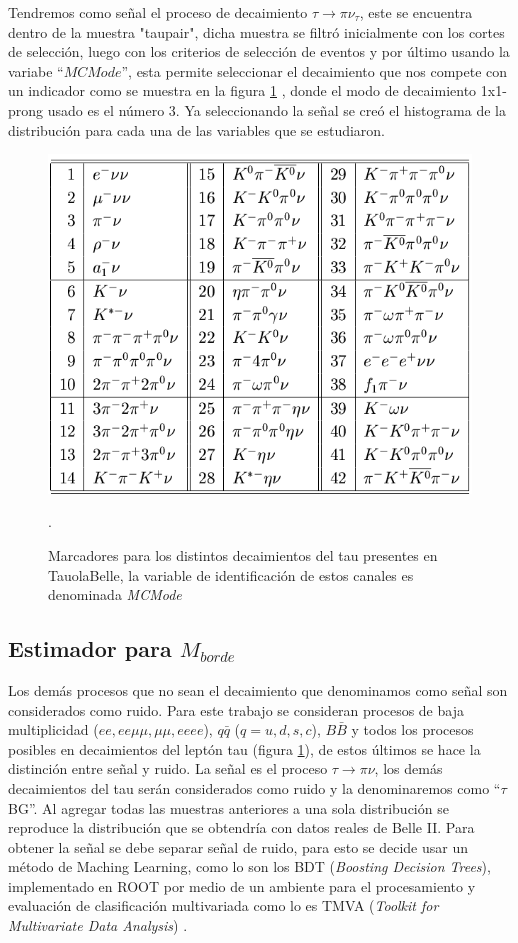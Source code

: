  Tendremos como señal el proceso de decaimiento \(\tau\rightarrow\pi\nu_{\tau}\), este se encuentra dentro de la muestra "taupair", dicha muestra se filtró inicialmente con los cortes de selección, luego con los criterios de selección de eventos y por último usando la variabe ``\(MCMode\)'', esta permite seleccionar el decaimiento que nos compete con un indicador como se muestra en la figura \ref{fig:TauDecay} , donde el modo de decaimiento 1x1-prong usado es el número 3. Ya seleccionando la señal se creó el histograma de la distribución para cada una de las variables que se estudiaron.
\begin{figure}[h]
    \centering
    \includegraphics[scale=.8]{Images/TauDecays.png}
    \caption{\small{Marcadores para los distintos decaimientos del tau presentes en TauolaBelle, la variable de identificación de estos canales es denominada \textit{MCMode}}}.
    \label{fig:TauDecay}
\end{figure}

\subsection{Estimador para \texorpdfstring{$M_{borde}$}{TEXT}}
Los demás procesos que no sean el decaimiento que denominamos como señal son considerados como ruido. Para este trabajo se consideran procesos de baja multiplicidad (\(ee,ee\mu\mu,\mu\mu,eeee\)), \(q\bar{q}\) (\(q = u,d,s,c\)), \(B\bar{B}\) y todos los procesos posibles en decaimientos del leptón tau (figura \ref{fig:TauDecay}), de estos últimos se hace la distinción entre señal y ruido. La señal es el proceso \(\tau\rightarrow\pi\nu\), los demás decaimientos del tau serán considerados como ruido y la denominaremos como ``\(\tau\)BG''. Al agregar todas las muestras anteriores a una sola distribución se reproduce la distribución que se obtendría con datos reales de Belle II. Para obtener la señal se debe separar señal de ruido, para esto se decide usar un método de Maching Learning, como lo son los BDT (\textit{Boosting Decision Trees}), implementado en ROOT por medio de un ambiente para el procesamiento y evaluación de clasificación multivariada como lo es TMVA (\textit{Toolkit for Multivariate Data Analysis}) \cite{Hocker:2007ht}.

